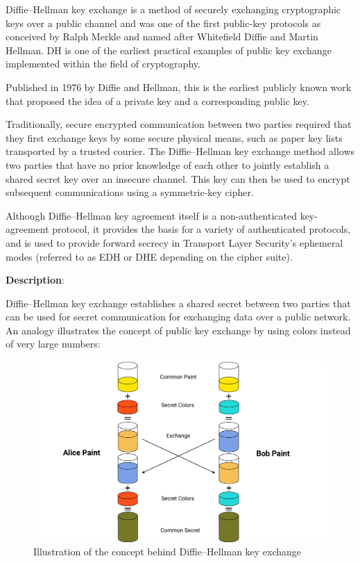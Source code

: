 Diffie–Hellman key exchange is a method of securely exchanging cryptographic keys over a public channel and was one of the first public-key protocols
as conceived by Ralph Merkle and named after Whitefield Diffie and Martin Hellman.
DH is one of the earliest practical examples of public key exchange implemented within the field of cryptography.

Published in 1976 by Diffie and Hellman, this is the earliest publicly known work that proposed the idea of a private key and a corresponding public key.

Traditionally, secure encrypted communication between two parties required that they first exchange keys by some secure physical means,
such as paper key lists transported by a trusted courier.
The Diffie–Hellman key exchange method allows two parties that have no prior knowledge of
each other to jointly establish a shared secret key over an insecure channel.
This key can then be used to encrypt subsequent communications using a symmetric-key cipher.

Although Diffie–Hellman key agreement itself is a non-authenticated key-agreement protocol, it provides the basis for a variety of authenticated protocols,
and is used to provide forward secrecy in Transport Layer Security's ephemeral modes (referred to as EDH or DHE depending on the cipher suite).

\textbf{Description}:

Diffie–Hellman key exchange establishes a shared secret between two parties that can be used for secret communication for exchanging data over a public network.
An analogy illustrates the concept of public key exchange by using colors instead of very large numbers:

\begin{figure}[H]
    \centering
    \includegraphics[width=1\textwidth]{Pictures/Diffie-Hellman.pdf}
    \caption{Illustration of the concept behind Diffie–Hellman key exchange}\label{fig:figure4}
\end{figure}

